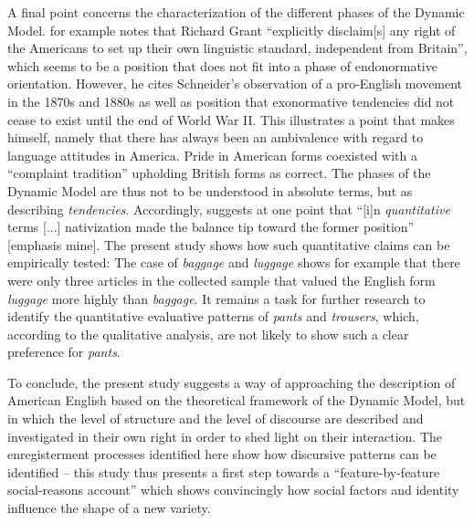 A final point concerns the characterization of the different phases of the Dynamic Model. \citet[92--93]{Busse2015} for example notes that Richard Grant \citet{White1870} “explicitly disclaim[s] any right of the Americans to set up their own linguistic standard, independent from Britain”, which seems to be a position that does not fit into a phase of endonormative orientation. However, he cites Schneider’s observation of a pro-English movement in the 1870s and 1880s as well as  position that exonormative tendencies did not cease to exist until the end of World War II. This illustrates a point that \citet[277]{Schneider2007} makes himself, namely that there has always been an ambivalence with regard to language attitudes in America. Pride in American forms coexisted with a “complaint tradition” upholding British forms as correct. The phases of the Dynamic Model are thus not to be understood in absolute terms, but as describing \emph{tendencies}. Accordingly, \citet[277]{Schneider2007} suggests at one point that “[i]n \emph{quantitative} terms [...] nativization made the balance tip toward the former position” [emphasis mine]. The present study shows how such quantitative claims can be empirically tested: The case of \emph{baggage} and \emph{luggage} shows for example that there were only three articles in the collected sample that valued the English form \emph{luggage} more highly than \emph{baggage}. It remains a task for further research to identify the quantitative evaluative patterns of \emph{pants} and \emph{trousers}, which, according to the qualitative analysis, are not likely to show such a clear preference for \emph{pants}.

 To conclude, the present study suggests a way of approaching the description of American English based on the theoretical framework of the Dynamic Model, but in which the level of structure and the level of discourse are described and investigated in their own right in order to shed light on their interaction. The enregisterment processes identified here show how discursive patterns can be identified – this study thus presents a first step towards a “feature-by-feature social-reasons account” \citep[279]{Trudgill2008b} which shows convincingly how social factors and identity influence the shape of a new variety.

